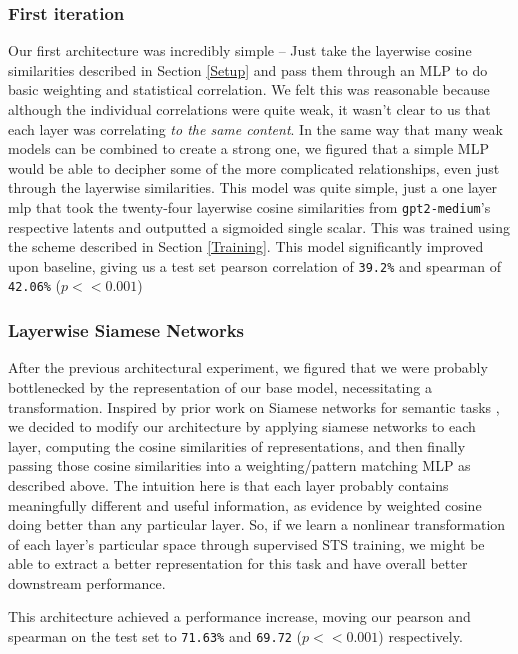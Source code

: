 \documentclass[14pt]{article}
\begin{document}
\subsubsection{First iteration}
Our first architecture was incredibly simple -- Just take the layerwise cosine similarities described in Section \ref {Setup} and pass them through an MLP to do basic weighting and statistical correlation. We felt this was reasonable because although the individual correlations were quite weak, it wasn't clear to us that each layer was correlating \textit{to the same content}. In the same way that many weak models can be combined to create a strong one, we figured that a simple MLP would be able to decipher some of the more complicated relationships, even just through the layerwise similarities. This model was quite simple, just a one layer mlp that took the twenty-four layerwise cosine similarities from \verb|gpt2-medium|'s respective latents and outputted a sigmoided single scalar. This was trained using the scheme described in Section \ref{Training}. This model significantly improved upon baseline, giving us a test set pearson correlation of \verb|39.2%| and spearman of \verb|42.06%| ($p<< 0.001$)

\subsubsection{Layerwise Siamese Networks}
After the previous architectural experiment, we figured that we were probably bottlenecked by the representation of our base model, necessitating a transformation. Inspired by prior work on Siamese networks for semantic tasks \cite{reimers2019sentencebertsentenceembeddingsusing}, we decided to modify our architecture by applying siamese networks to each layer, computing the cosine similarities of  representations, and then finally passing those cosine similarities into a weighting/pattern matching MLP as described above. The intuition here is that each layer probably contains meaningfully different and useful information, as evidence by weighted cosine doing better than any particular layer. So, if we learn a nonlinear transformation of each layer's particular space through supervised STS training, we might be able to extract a better representation for this task and have overall better downstream performance.

This architecture achieved a  performance increase, moving our pearson and spearman on the test set to \verb|71.63%| and \verb|69.72| ($p << 0.001$) respectively.
\end{document}
